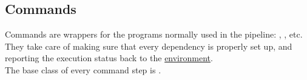 \subsection{Commands}\label{subsec:steps_commands}
    Commands are wrappers for the programs normally used in the pipeline: , , etc.
    They take care of making sure that every dependency is properly set up, and reporting the execution status back to
    the \hyperref[sec:environments]{environment}.\\

    The base class of every command step is .

\subsection*{}\label{subsec:CommandBase}


